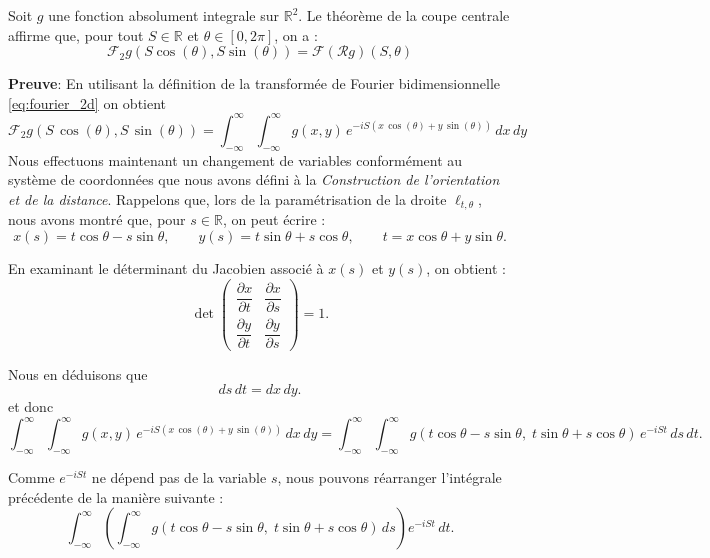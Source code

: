 \begin{proposition}
    Soit \( g \) une fonction absolument integrale sur \( \mathbb{R}^2 \).
    Le théorème de la coupe centrale affirme que, pour tout $S \in \mathbb{R}$ et $\theta \in [0,2\pi]$, on a : 
    \begin{equation}
        \mathcal{F}_2 g(S\cos(\theta), S\sin(\theta)) = \mathcal{F}(\mathcal{R}g)(S, \theta)
    \end{equation}
\end{proposition}
\textbf{Preuve}: En utilisant la définition de la transformée de Fourier bidimensionnelle \eqref{eq:fourier_2d} on obtient 
\begin{equation}
    \mathcal{F}_{2}g(S\,\cos(\theta), S\,\sin(\theta)) = \int_{-\infty}^{\infty} \int_{-\infty}^{\infty} g(x, y)\, e^{-iS (x\,\cos(\theta) + y\,\sin(\theta))}\, dx\, dy
\end{equation}
Nous effectuons maintenant un changement de variables conformément au système
de coordonnées que nous avons défini à la \textit{Construction de l'orientation et de la distance}.
Rappelons que, lors de la paramétrisation de la droite $\ell_{t,\theta}$,
nous avons montré que, pour $s\in\mathbb{R}$, on peut écrire :
\begin{equation}
x(s)=t\cos\theta - s\sin\theta, 
\qquad
y(s)=t\sin\theta + s\cos\theta,
\qquad
t = x\cos\theta + y\sin\theta.
\end{equation}

En examinant le déterminant du Jacobien associé à $x(s)$ et $y(s)$, on obtient :
\begin{equation}
\det
\begin{pmatrix}
\dfrac{\partial x}{\partial t} & \dfrac{\partial x}{\partial s} \\
\dfrac{\partial y}{\partial t} & \dfrac{\partial y}{\partial s}
\end{pmatrix}
= 1.
\end{equation}

Nous en déduisons que
\begin{equation}
ds\,dt = dx\,dy.
\end{equation}
et donc
\begin{equation}
\int_{-\infty}^{\infty} \int_{-\infty}^{\infty} g(x, y)\, e^{-iS (x\,\cos(\theta) + y\,\sin(\theta))}\, dx\, dy = \int_{-\infty}^{\infty}\int_{-\infty}^{\infty}
g(t\cos\theta - s\sin\theta,\; t\sin\theta + s\cos\theta)\,
e^{-iSt}\,ds\,dt.
\end{equation}

Comme $e^{-iSt}$ ne dépend pas de la variable $s$, nous pouvons réarranger
l'intégrale précédente de la manière suivante :
\begin{equation}
\int_{-\infty}^{\infty}
\left(
\int_{-\infty}^{\infty}
g(t\cos\theta - s\sin\theta,\; t\sin\theta + s\cos\theta)\,ds
\right)
e^{-iSt}\,dt.
\end{equation}

